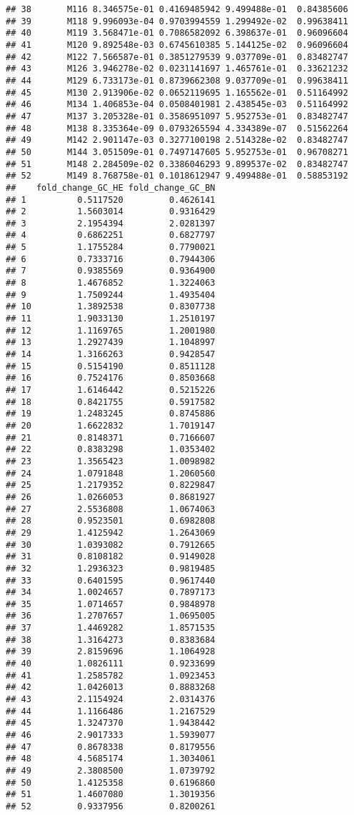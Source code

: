 \documentclass[
]{article}
\begin{document}
\begin{verbatim}
## 38       M116 8.346575e-01 0.4169485942 9.499488e-01  0.84385606
## 39       M118 9.996093e-04 0.9703994559 1.299492e-02  0.99638411
## 40       M119 3.568471e-01 0.7086582092 6.398637e-01  0.96096604
## 41       M120 9.892548e-03 0.6745610385 5.144125e-02  0.96096604
## 42       M122 7.566587e-01 0.3851279539 9.037709e-01  0.83482747
## 43       M126 3.946278e-02 0.0231141697 1.465761e-01  0.33621232
## 44       M129 6.733173e-01 0.8739662308 9.037709e-01  0.99638411
## 45       M130 2.913906e-02 0.0652119695 1.165562e-01  0.51164992
## 46       M134 1.406853e-04 0.0508401981 2.438545e-03  0.51164992
## 47       M137 3.205328e-01 0.3586951097 5.952753e-01  0.83482747
## 48       M138 8.335364e-09 0.0793265594 4.334389e-07  0.51562264
## 49       M142 2.901147e-03 0.3277100198 2.514328e-02  0.83482747
## 50       M144 3.051509e-01 0.7497147605 5.952753e-01  0.96708271
## 51       M148 2.284509e-02 0.3386046293 9.899537e-02  0.83482747
## 52       M149 8.768758e-01 0.1018612947 9.499488e-01  0.58853192
##    fold_change_GC_HE fold_change_GC_BN
## 1          0.5117520         0.4626141
## 2          1.5603014         0.9316429
## 3          2.1954394         2.0281397
## 4          0.6862251         0.6827797
## 5          1.1755284         0.7790021
## 6          0.7333716         0.7944306
## 7          0.9385569         0.9364900
## 8          1.4676852         1.3224063
## 9          1.7509244         1.4935404
## 10         1.3892538         0.8307738
## 11         1.9033130         1.2510197
## 12         1.1169765         1.2001980
## 13         1.2927439         1.1048997
## 14         1.3166263         0.9428547
## 15         0.5154190         0.8511128
## 16         0.7524176         0.8503668
## 17         1.6146442         0.5215226
## 18         0.8421755         0.5917582
## 19         1.2483245         0.8745886
## 20         1.6622832         1.7019147
## 21         0.8148371         0.7166607
## 22         0.8383298         1.0353402
## 23         1.3565423         1.0098982
## 24         1.0791848         1.2060560
## 25         1.2179352         0.8229847
## 26         1.0266053         0.8681927
## 27         2.5536808         1.0674063
## 28         0.9523501         0.6982808
## 29         1.4125942         1.2643069
## 30         1.0393082         0.7912665
## 31         0.8108182         0.9149028
## 32         1.2936323         0.9819485
## 33         0.6401595         0.9617440
## 34         1.0024657         0.7897173
## 35         1.0714657         0.9848978
## 36         1.2707657         1.0695005
## 37         1.4469282         1.8571535
## 38         1.3164273         0.8383684
## 39         2.8159696         1.1064928
## 40         1.0826111         0.9233699
## 41         1.2585782         1.0923453
## 42         1.0426013         0.8883268
## 43         2.1154924         2.0314376
## 44         1.1166486         1.2167529
## 45         1.3247370         1.9438442
## 46         2.9017333         1.5939077
## 47         0.8678338         0.8179556
## 48         4.5685174         1.3034061
## 49         2.3808500         1.0739792
## 50         1.4125358         0.6196860
## 51         1.4607080         1.3019356
## 52         0.9337956         0.8200261
\end{verbatim}
\end{document}
